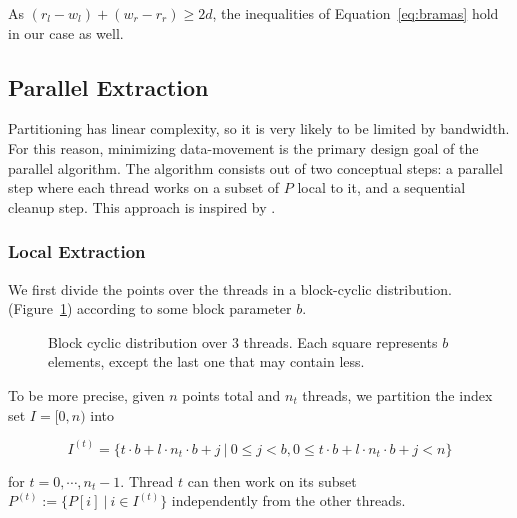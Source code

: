 As $(r_l - w_l) + (w_r - r_r) \geq 2d$, the inequalities of 
Equation~\ref{eq:bramas} hold in our case as well.

\subsection{Parallel Extraction}

Partitioning has linear complexity, so it is very likely to be limited by
bandwidth. For this reason, minimizing data-movement is the primary design goal
of the parallel algorithm. The algorithm consists out of two conceptual steps:
a parallel step where each thread works on a subset of $P$ local to it, and 
a sequential cleanup step. This approach is inspired by \cite{francis92}.

\subsubsection{Local Extraction}

We first divide the points over the threads in a block-cyclic distribution.
(Figure~\ref{fig:blockcycl}) according to some block parameter $b$.

\begin{figure}[ht]
    \caption{Block cyclic distribution over $3$ threads. Each square represents
             $b$ elements, except the last one that may contain less.}
    \label{fig:blockcycl}
\end{figure}

To be more precise, given $n$ points total and $n_t$ threads, we partition
the index set $I = [0, n)$ into

$$I^{(t)} = \{t \cdot b + l \cdot n_t \cdot b + j \ | \ 0 \leq j < b,
                0 \leq t \cdot b + l \cdot n_t \cdot b + j < n\}$$

for $t = 0, \cdots, n_t - 1$. Thread $t$ can then work on its subset
$P^{(t)} := \{P[i] \ | \ i \in I^{(t)}\}$ independently from the other threads.

